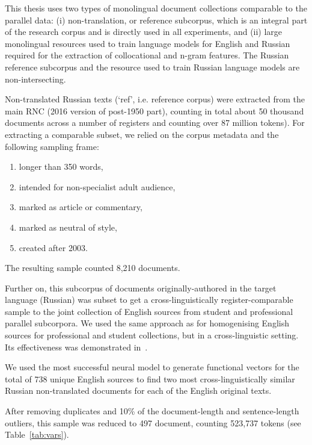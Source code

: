 This thesis uses two types of monolingual document collections comparable to the parallel data: (i) non-translation, or reference subcorpus, which is an integral part of the research corpus and is directly used in all experiments, and (ii) large monolingual resources used to train language models for English and Russian required for the extraction of collocational and n-gram features. 
The Russian reference subcorpus and the resource used to train Russian language models are non-intersecting.  

Non-translated Russian texts (`ref', i.e. reference corpus) were extracted from the main \gls{RNC} (2016 version of post-1950 part), counting in total about 50 thousand documents across a number of registers and counting over 87 million tokens). %
For extracting a comparable subset, we relied on the corpus metadata and the following sampling frame:

\begin{enumerate}\compresslist{}
	\item longer than 350 words,
	\item intended for non-specialist adult audience,
	\item marked as article or commentary,
	\item marked as neutral of style,
	\item created after 2003.
\end{enumerate}

The resulting sample counted 8,210 documents.

Further on, this subcorpus of documents originally-authored in the target language (Russian) was subset to get a cross-linguistically register-comparable sample to the joint collection of English sources from student and professional parallel subcorpora. We used the same approach as for homogenising English sources for professional and student collections, but in a cross-linguistic setting. Its effectiveness was demonstrated in~\citet{Kunilovskaya2019crossling}.

We used the most successful neural model to generate functional vectors for the total of 738 unique English sources to find two most cross-linguistically similar Russian non-translated documents for each of the English original texts. 

After removing duplicates and 10\% of the document-length and sentence-length outliers, this sample was reduced to 497 document, counting 523,737 tokens (see Table~\ref{tab:vars}). 

